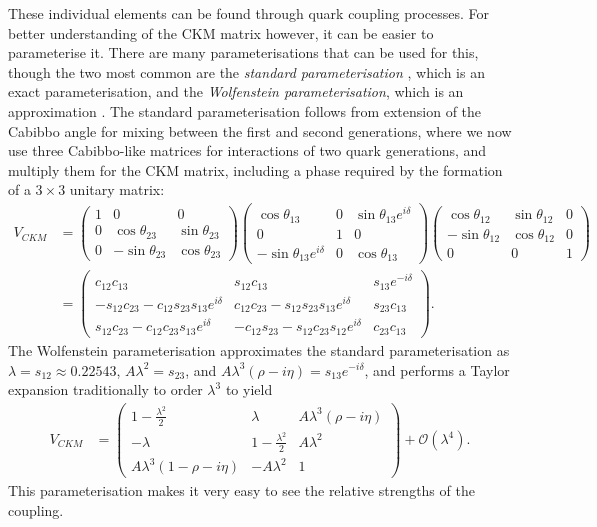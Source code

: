 \documentclass[a4paper,12pt]{article}
\begin{document}
These individual elements can be found through quark coupling processes. 
For better understanding of the CKM matrix however, it can be easier to parameterise it. 
There are many parameterisations that can be used for this, though the two most common are the \emph{standard parameterisation} \cite{d}, which is an exact parameterisation, and the \emph{Wolfenstein parameterisation}, which is an approximation \cite{wolf}.
The standard parameterisation follows from extension of the Cabibbo angle for mixing between the first and second generations, where we now use three Cabibbo-like matrices for interactions of two quark generations, and multiply them for the CKM matrix, including a phase required by the formation of a $3\times3$ unitary matrix:
\begin{equation}
    \label{eq:standpar}
    \begin{split}
        V_{CKM} &= \begin{pmatrix}1&0&0\\0&\cos\theta_{23}&\sin\theta_{23}\\0&-\sin\theta_{23}&\cos\theta_{23}\end{pmatrix}\begin{pmatrix}\cos\theta_{13}&0&\sin\theta_{13}e^{i\delta}\\0&1&0\\-\sin\theta_{13}e^{i\delta}&0&\cos\theta_{13}\end{pmatrix}\begin{pmatrix}\cos\theta_{12}&\sin\theta_{12}&0\\-\sin\theta_{12}&\cos\theta_{12}&0\\0&0&1\end{pmatrix}\\
                &= \begin{pmatrix}c_{12}c_{13} & s_{12}c_{13} & s_{13}e^{-i\delta} \\ -s_{12}c_{23}-c_{12}s_{23}s_{13}e^{i\delta} & c_{12}c_{23}-s_{12}s_{23}s_{13}e^{i\delta} & s_{23}c_{13} \\ s_{12}c_{23}-c_{12}c_{23}s_{13}e^{i\delta} & -c_{12}s_{23}-s_{12}c_{23}s_{12}e^{i\delta} & c_{23}c_{13}\end{pmatrix}.
    \end{split}
\end{equation}
The Wolfenstein parameterisation approximates the standard parameterisation as $\lambda=s_{12}\approx0.22543$, $A\lambda^2=s_{23}$, and $A\lambda^3(\rho-i\eta)=s_{13}e^{-i\delta}$, and performs a Taylor expansion traditionally to order $\lambda^3$ to yield
\begin{align}
    \label{eq:wolfie}
    V_{CKM} &= \begin{pmatrix} 1-\frac{\lambda^2}{2} & \lambda & A\lambda^3(\rho-i\eta) \\ -\lambda & 1-\frac{\lambda^2}{2} & A\lambda^2 \\ A\lambda^3(1-\rho-i\eta) & -A\lambda^2 & 1\end{pmatrix} + \mathcal{O}(\lambda^4).
\end{align}
This parameterisation makes it very easy to see the relative strengths of the coupling. 
\end{document}
